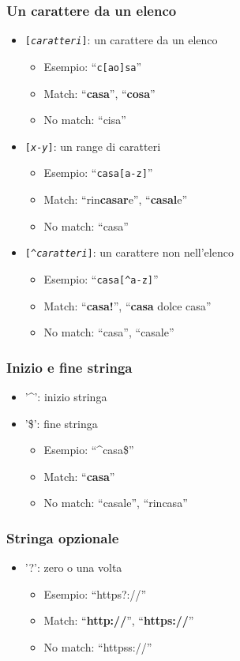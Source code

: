 \documentclass[xetex,table]{beamer}
\begin{document}
\begin{frame}
  \frametitle{Un carattere da un elenco}
  \begin{itemize}
  \item \texttt{[{\em caratteri}]}: un carattere da un elenco
    \begin{itemize}
    \item Esempio: ``\texttt{c[ao]sa}''
    \item Match: ``{\bf casa}'', ``{\bf cosa}''
    \item No match: ``cisa''
    \end{itemize}
  \item \texttt{[{\em x-y}]}: un range di caratteri
    \begin{itemize}
    \item Esempio: ``\texttt{casa[a-z]}''
    \item Match: ``rin{\bf casar}e'', ``{\bf casal}e''
    \item No match: ``casa''
    \end{itemize}
  \item \texttt{[\^{}{\em caratteri}]}: un carattere non nell'elenco
    \begin{itemize}
    \item Esempio: ``\texttt{casa[\^{}a-z]}''
    \item Match: ``{\bf casa!}'', ``{\bf casa }dolce casa''
    \item No match: ``casa'', ``casale''
    \end{itemize}
  \end{itemize}
\end{frame}

\begin{frame}
  \frametitle{Inizio e fine stringa}
  \begin{itemize}
  \item '\^{}': inizio stringa
  \item '\${}': fine stringa
    \begin{itemize}
    \item Esempio: ``\^{}casa\${}''
    \item Match: ``{\bf casa}''
    \item No match: ``casale'', ``rincasa''
    \end{itemize}
  \end{itemize}
\end{frame}

\begin{frame}
  \frametitle{Stringa opzionale}
  \begin{itemize}
  \item '?': zero o una volta
    \begin{itemize}
    \item Esempio: ``https?://''
    \item Match: ``{\bf http://}'', ``{\bf https://}''
    \item No match: ``httpss://''
    \end{itemize}
  \end{itemize}
\end{frame}
\end{document}
